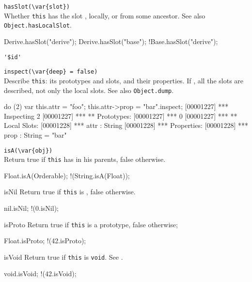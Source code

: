 \begin{urbiscriptapi}
\item \lstinline|hasSlot(\var{slot})|\\
  Whether \lstinline|this| has the slot , locally, or from
  some ancestor.  See also \lstinline|Object.hasLocalSlot|.

\begin{urbiassert}
Derive.hasSlot("derive");
Derive.hasSlot("base");
!Base.hasSlot("derive");
\end{urbiassert}

\item \lstinline|'$id'|\\ %

\item \lstinline|inspect(\var{deep} = false)|\\
  Describe \lstinline|this|: its prototypes and slots, and their
  properties.  If , all the slots are described, not only
  the local slots. See also \lstinline|Object.dump|.
\begin{urbiscript}
do (2) { var this.attr = "foo"; this.attr->prop = "bar"}.inspect;
[00001227] *** Inspecting 2
[00001227] *** ** Prototypes:
[00001227] ***   0
[00001227] *** ** Local Slots:
[00001228] ***   attr : String
[00001228] ***     Properties:
[00001228] ***      prop : String = "bar"
\end{urbiscript}

\item \lstinline|isA(\var{obj})|\\
  Return true if \lstinline|this| has  in his parents, false
  otherwise.
\begin{urbiassert}
Float.isA(Orderable);
!(String.isA(Float));
\end{urbiassert}

\item[isNil]
  Return true if \lstinline|this| is , false otherwise.
\begin{urbiassert}
nil.isNil;
!(0.isNil);
\end{urbiassert}

\item[isProto]
  Return true if \lstinline|this| is a prototype, false otherwise;
\begin{urbiassert}
Float.isProto;
!(42.isProto);
\end{urbiassert}

\item[isVoid]
  Return true if \lstinline|this| is \lstinline|void|.  See
  .
\begin{urbiassert}
void.isVoid;
!(42.isVoid);
\end{urbiassert}


\end{urbiscriptapi}
